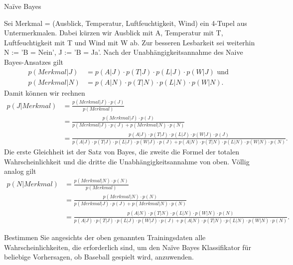 \begin{task}[credit=19]{Na\"ive Bayes}
\begin{subtask}[title={Formel für Merkmalsausprägung},points=4]
\begin{solution}
Sei Merkmal = (Ausblick, Temperatur, Luftfeuchtigkeit, Wind) ein 4-Tupel aus Untermerkmalen. Dabei kürzen wir Ausblick mit A, Temperatur mit T, Luftfeuchtigkeit mit T und Wind mit W ab. Zur besseren Lesbarkeit sei weiterhin N := 'B = Nein', J := 'B = Ja'. Nach der Unabhängigkeitsannahme des Naive Bayes-Ansatzes gilt \begin{align*}
p(Merkmal|J) &= p(A|J)\cdot p(T|J)\cdot p(L|J)\cdot p(W|J) \text{ und } \\
p(Merkmal|N) &= p(A|N)\cdot p(T|N)\cdot p(L|N)\cdot p(W|N).
\end{align*} Damit können wir rechnen \begin{align*}
p(J|Merkmal) &= \frac{p(Merkmal|J)\cdot p(J)}{p(Merkmal)} \\
&= \frac{p(Merkmal|J)\cdot p(J)}{p(Merkmal|J)\cdot p(J) + p(Merkmal|N)\cdot p(N) } \\ &= \frac{ p(A|J)\cdot p(T|J)\cdot p(L|J)\cdot p(W|J)\cdot p(J)}{p(A|J)\cdot p(T|J)\cdot p(L|J)\cdot p(W|J)\cdot p(J) +  p(A|N)\cdot p(T|N)\cdot p(L|N)\cdot p(W|N)\cdot p(N) }.
\end{align*} Die erste Gleichheit ist der Satz von Bayes, die zweite die Formel der totalen Wahrscheinlichkeit und die dritte die Unabhängigkeitsannahme von oben. Völlig analog gilt \begin{align*}
p(N|Merkmal) &= \frac{p(Merkmal|N)\cdot p(N)}{p(Merkmal)} \\
&= \frac{p(Merkmal|N)\cdot p(N)}{p(Merkmal|J)\cdot p(J) + p(Merkmal|N)\cdot p(N) } \\ &= \frac{ p(A|N)\cdot p(T|N)\cdot p(L|N)\cdot p(W|N)\cdot p(N)}{p(A|J)\cdot p(T|J)\cdot p(L|J)\cdot p(W|J)\cdot p(J) +  p(A|N)\cdot p(T|N)\cdot p(L|N)\cdot p(W|N)\cdot p(N) }.
\end{align*}
\end{solution}

\end{subtask}
 
\begin{subtask}[title=Wahrscheinlichkeiten,points=6]
Bestimmen Sie angesichts der oben genannten Trainingsdaten alle Wahrscheinlichkeiten, die erforderlich sind, um den Na\"ive Bayes Klassifikator für beliebige Vorhersagen, ob Baseball gespielt wird, anzuwenden.


\end{subtask}
\end{task}
